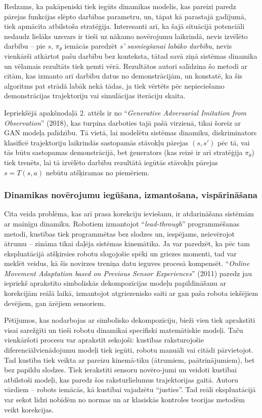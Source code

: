 \documentclass[12pt, a4paper]{article}
\numberwithin{equation}{section} %
\begin{document}
Redzams, ka pakāpeniski tiek iegūts dinamikas modelis, kas pareizi paredz pārejas funkcijas slēpto darbības parametru, un, tāpat kā parastajā gadījumā, tiek apmācīta atbilstoša stratēģija. Interesanti arī, ka šajā situācijā potenciāli nedaudz lielāks uzsvars ir tieši uz nākamo novērojumu laikrindā, nevis izvēlēto darbību -- pie $s$, $\pi_{\theta}$ iemācās paredzēt \textit{s' sasniegšanai labāko darbību}, nevis vienkārši atkārtot pašu darbību bez konteksta, tātad savā ziņā sistēmas dinamika un vēlamais rezultāts tiek ņemti vērā. Rezultātos autori salīdzina šo metodi ar citām, kas izmanto arī darbību datus no demonstrācijām, un konstatē, ka šis algoritms pat strādā labāk nekā tādas, ja tiek vērtēts pēc nepieciešamo demonstrācijas trajektoriju vai simulācijas iterāciju skaita.

Iepriekšējā apakšnodaļā 2. attēls ir no ``\textit{Generative Adversarial Imitation from Observation}'' \cite{torabi2018behavioral} (2018), kas turpina darboties tajā pašā virzienā, tikai šoreiz ar GAN modeļa palīdzību. Tā vietā, lai modelētu sistēmas dinamiku, diskriminators klasificē trajektoriju laikrindās sastopamās stāvokļu pārejas $(s, s')$ pēc tā, vai tās būtu sastopamas demonstrācijā, bet ģenerators (kas reizē ir arī stratēģija $\pi_{\theta}$) tiek trenēts, lai tā izvēlēto darbību rezultātā iegūtās stāvokļu pārejas $s=T(s,a)$ nebūtu atšķiramas no piemēriem.

\subsubsection{Dinamikas novērojumu iegūšana, izmantošana, vispārināšana} 

Cita veida problēma, kas arī prasa korekciju ieviešanu, ir atdarināšana sistēmām ar mainīgu dinamiku. Robotiem izmantojot ``\textit{lead-through}'' programmēšanas metodi, kustības tiek programmētas bez slodzes un, iespējams, neievērojot ātrumu -- zināma tikai daļēja sistēmas kinemātika. Ja var paredzēt, ka pēc tam ekspluatācijā atšķirsies robotu slogojošie spēki un griezes momenti, tad var meklēt veidus, kā šīs novirzes treniņa datu ieguves procesā kompensēt. ``\textit{Online Movement Adaptation based on Previous Sensor Experiences}'' \cite{pastor2011online} (2011) paredz jau iepriekš aprakstīto simboliskās dekompozīcijas modeļu papildināšanu ar korekcijām reālā laikā, izmantojot atgriezenisko saiti ar gan paša robota iekšējiem devējiem, gan ārējiem sensoriem. 

Pētījumos, kas nodarbojas ar simbolisko dekompozīciju, bieži vien tiek aprakstīti visai sarežģīti un tieši robotu dinamikai specifiski matemātiskie modeļi. Taču vienkāršoti procesu var aprakstīt sekojoši: kustības raksturojošie diferenciālvienādojumu modeļi tiek iegūti, robotu manuāli vai citādi pārvietojot. Tad kustība tiek veikta ar pareizu kinemā-tiku (ātrumiem, paātrinājumiem), bet bez papildu slodzes. Tiek ierakstīti sensoru novēro-jumi un veidoti kustībai atbilstoši modeļi, kas paredz šos raksturlielumus trajektorijas gaitā. Autoru vārdiem -- robots iemācās, kā kustībai vajadzētu ``justies''. Tad reāli ekspluatācijā var sekot līdzi nobīdēm no normas un ar klasiskās kontroles teorijas metodēm veikt korekcijas.
\end{document}
